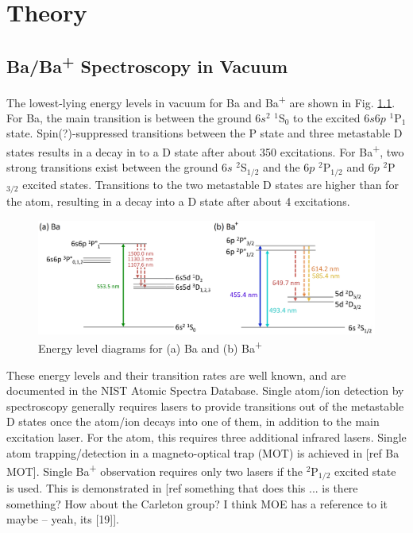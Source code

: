 \chapter{Theory}


\section{Ba/Ba\textsuperscript{+} Spectroscopy in Vacuum}

The lowest-lying energy levels in vacuum for Ba and Ba\textsuperscript{+} are shown in Fig. \ref{fig:elevs}.  For Ba, the main transition is between the ground $6s^{2}$ $^{1}$S$_{0}$ to the excited $6s6p$ $^{1}$P$_{1}$ state.  Spin{\color{red}(?)}-suppressed transitions between the P state and three metastable D states results in a decay in to a D state after about 350 excitations.  For Ba\textsuperscript{+}, two strong transitions exist between the ground $6s$ $^{2}$S$_{1/2}$ and the $6p$ $^{2}$P$_{1/2}$ and $6p$ $^{2}$P$_{3/2}$ excited states.  Transitions to the two metastable D states are higher than for the atom, resulting in a decay into a D state after about 4 excitations.

\begin{figure}[H]
	\includegraphics[width=.9\textwidth]{figures/elevs.png}
	\caption{Energy level diagrams for (a) Ba and (b) Ba\textsuperscript{+}}
    \label{fig:elevs}
\end{figure}

These energy levels and their transition rates are well known, and are documented in the NIST Atomic Spectra Database.  Single atom/ion detection by spectroscopy generally requires lasers to provide transitions out of the metastable D states once the atom/ion decays into one of them, in addition to the main excitation laser.  For the atom, this requires three additional infrared lasers.  Single atom trapping/detection in a magneto-optical trap (MOT) is achieved in [ref Ba MOT].  Single Ba\textsuperscript{+} observation requires only two lasers if the $^{2}$P$_{1/2}$ excited state is used.  This is demonstrated in [ref something that does this ... is there something?  How about the Carleton group?  I think MOE has a reference to it maybe -- yeah, its [19]].


